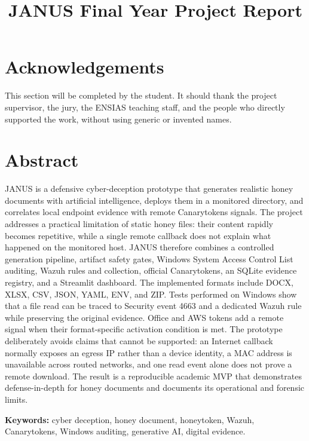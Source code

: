 \documentclass{rapportENSIAS}
\title{JANUS Final Year Project Report}
\begin{document}

\fairemarges
\fairepagedegarde


\chapter*{Acknowledgements}
This section will be completed by the student. It should thank the project
supervisor, the jury, the ENSIAS teaching staff, and the people who directly
supported the work, without using generic or invented names.

\chapter*{Abstract}
JANUS is a defensive cyber-deception prototype that generates realistic
honey documents with artificial intelligence, deploys them in a monitored
directory, and correlates local endpoint evidence with remote Canarytokens
signals. The project addresses a practical limitation of static honey files:
their content rapidly becomes repetitive, while a single remote callback does
not explain what happened on the monitored host. JANUS therefore combines a
controlled generation pipeline, artifact safety gates, Windows System Access
Control List auditing, Wazuh rules and collection, official Canarytokens, an
SQLite evidence registry, and a Streamlit dashboard. The implemented formats
include DOCX, XLSX, CSV, JSON, YAML, ENV, and ZIP. Tests performed on Windows
show that a file read can be traced to Security event 4663 and a dedicated
Wazuh rule while preserving the original evidence. Office and AWS tokens add a
remote signal when their format-specific activation condition is met. The
prototype deliberately avoids claims that cannot be supported: an Internet
callback normally exposes an egress IP rather than a device identity, a MAC
address is unavailable across routed networks, and one read event alone does
not prove a remote download. The result is a reproducible academic MVP that
demonstrates defense-in-depth for honey documents and documents its operational
and forensic limits.

\vspace{0.5em}
\noindent\textbf{Keywords:} cyber deception, honey document, honeytoken,
Wazuh, Canarytokens, Windows auditing, generative AI, digital evidence.
\end{document}
